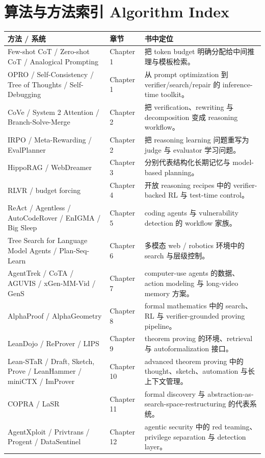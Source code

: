 \chapter{算法与方法索引 Algorithm Index}
\small
\begin{longtable}{p{}p{}p{}}
\toprule
方法 / 系统 & 章节 & 书中定位 \\
\midrule
\endhead
Few-shot CoT / Zero-shot CoT / Analogical Prompting & Chapter 1 & 把 token budget 明确分配给中间推理与模板检索。 \\
OPRO / Self-Consistency / Tree of Thoughts / Self-Debugging & Chapter 1 & 从 prompt optimization 到 verifier/search/repair 的 inference-time toolkit。 \\
CoVe / System 2 Attention / Branch-Solve-Merge & Chapter 2 & 把 verification、rewriting 与 decomposition 变成 reasoning workflow。 \\
IRPO / Meta-Rewarding / EvalPlanner & Chapter 2 & 把 reasoning learning 问题重写为 judge 与 evaluator 学习问题。 \\
HippoRAG / WebDreamer & Chapter 3 & 分别代表结构化长期记忆与 model-based planning。 \\
RLVR / budget forcing & Chapter 4 & 开放 reasoning recipes 中的 verifier-backed RL 与 test-time control。 \\
ReAct / Agentless / AutoCodeRover / EnIGMA / Big Sleep & Chapter 5 & coding agents 与 vulnerability detection 的 workflow 家族。 \\
Tree Search for Language Model Agents / Plan-Seq-Learn & Chapter 6 & 多模态 web / robotics 环境中的 search 与层级控制。 \\
AgentTrek / CoTA / AGUVIS / xGen-MM-Vid / GenS & Chapter 7 & computer-use agents 的数据、action modeling 与 long-video memory 方案。 \\
AlphaProof / AlphaGeometry & Chapter 8 & formal mathematics 中的 search、RL 与 verifier-grounded proving pipeline。 \\
LeanDojo / ReProver / LIPS & Chapter 9 & theorem proving 的环境、retrieval 与 autoformalization 接口。 \\
Lean-STaR / Draft, Sketch, Prove / LeanHammer / miniCTX / ImProver & Chapter 10 & advanced theorem proving 中的 thought、sketch、automation 与长上下文管理。 \\
COPRA / LaSR & Chapter 11 & formal discovery 与 abstraction-as-search-space-restructuring 的代表系统。 \\
AgentXploit / Privtrans / Progent / DataSentinel & Chapter 12 & agentic security 中的 red teaming、privilege separation 与 detection layer。 \\
\bottomrule
\end{longtable}
\normalsize
